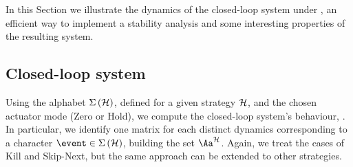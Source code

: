 In this Section we illustrate the dynamics of the closed-loop system under \ewhc{}, an efficient way to implement a stability analysis and some interesting properties of the resulting system.

\subsection{Closed-loop system}%
\label{sec:matrices}

Using the alphabet $\Sigma\left(\mathcal{H}\right)$, defined for a given strategy $\mathcal{H}$, and the chosen actuator mode (Zero or Hold), we compute the closed-loop system's behaviour, .
In particular, we identify one matrix for each distinct dynamics corresponding to a character $\event \in \Sigma\left( \strat \right)$, building the set $\Aa^\strat$.
Again, we treat the cases of Kill and Skip-Next, but the same approach can be extended to other strategies.

